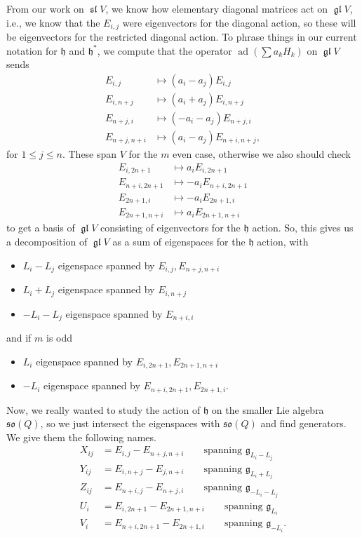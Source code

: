 \documentclass[12pt]{article}
\newcommand{\fg}{\mathfrak{g}}
\newcommand{\fh}{\mathfrak{h}}
\newcommand{\gl}{\operatorname{\mathfrak{gl}}}
\DeclareMathOperator{\ad}{ad}
\newcommand{\so}{\mathfrak{so}}
\newcommand{\fsl}{\operatorname{\mathfrak{sl}}}
\begin{document}
From our work on $\fsl V$, we know how elementary diagonal matrices act on $\gl V$, i.e., we know that the $E_{i,j}$ were eigenvectors for the diagonal action, so these will be eigenvectors for the restricted diagonal action. To phrase things in our current notation for $\fh$ and $\fh^*$, we compute that the operator $\ad (\sum a_k H_k)$ on $\gl V$ sends
\begin{align*}
    E_{i,j} &\mapsto (a_i - a_j) E_{i,j}\\
    E_{i,n+j} &\mapsto (a_i + a_j)E_{i,n+j}\\
    E_{n+j,i} &\mapsto (-a_i - a_j)E_{n+j,i}\\
    E_{n+j,n+i} &\mapsto (a_i - a_j)E_{n+i,n+j},
\end{align*}
for $1\leq j\leq n$. These span $V$ for the $m$ even case, otherwise we also should check
\begin{align*}
    E_{i,2n+1} &\mapsto a_i E_{i,2n+1}\\
    E_{n+i,2n+1} &\mapsto -a_i E_{n+i,2n+1}\\
    E_{2n+1,i} &\mapsto -a_i E_{2n+1,i}\\
    E_{2n+1,n+i} &\mapsto a_i E_{2n+1,n+i}
\end{align*}
to get a basis of $\gl V$ consisting of eigenvectors for the $\fh$ action. So, this gives us a decomposition of $\gl V$ as a sum of eigenspaces for the $\fh$ action, with
\begin{itemize}
    \item $L_i-L_j$ eigenspace spanned by $E_{i,j},E_{n+j,n+i}$
    \item $L_i+L_j$ eigenspace spanned by $E_{i,n+j}$
    \item $-L_i-L_j$ eigenspace spanned by $E_{n+i,i}$
\end{itemize}
and if $m$ is odd
\begin{itemize}
    \item $L_i$ eigenspace spanned by $E_{i,2n+1}, E_{2n+1,n+i}$
    \item $-L_i$ eigenspace spanned by $E_{n+i,2n+1},E_{2n+1,i}$.
\end{itemize}
Now, we really wanted to study the action of $\fh$ on the smaller Lie algebra $\so(Q)$, so we just intersect the eigenspaces with $\so(Q)$ and find generators. We give them the following names.
\begin{align*}
    X_{ij} &= E_{i,j}-E_{n+j,n+i} \qquad \text{spanning $\fg_{L_i-L_j}$}\\
    Y_{ij} &= E_{i,n+j}-E_{j,n+i} \qquad \text{spanning $\fg_{L_i+L_j}$}\\
    Z_{ij} &= E_{n+i,j}-E_{n+j,i} \qquad \text{spanning $\fg_{-L_i-L_j}$}\\
    U_i &= E_{i,2n+1} - E_{2n+1,n+i} \qquad \text{spanning $\fg_{L_i}$}\\
    V_i &= E_{n+i,2n+1} - E_{2n+1,i} \qquad \text{spanning $\fg_{-L_i}$}.
\end{align*}
\end{document}
